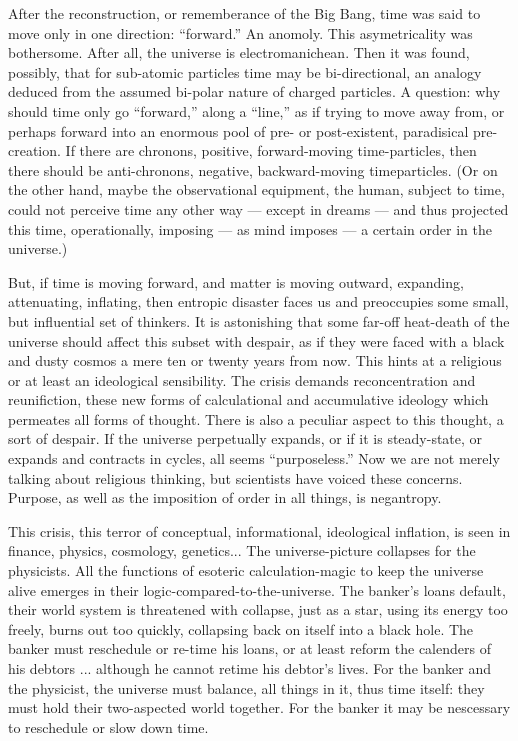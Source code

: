 \documentclass[11pt,twoside,draft]{memoir}
\begin{document}
After the reconstruction, or rememberance
of the Big Bang, time was said to move only
in one direction: \enquote{forward.} An anomoly.
This asymetricality was bothersome. After
all, the universe is electromanichean. Then
it was found, possibly, that for sub-atomic
particles time may be bi-directional, an analogy deduced from the assumed bi-polar nature of charged particles. A question: why
should time only go \enquote{forward,} along a
\enquote{line,} as if trying to move away from, or
perhaps forward into an enormous pool of
pre- or post-existent, paradisical pre-creation.
If there are chronons, positive, forward-moving time-particles, then there should be anti-chronons, negative, backward-moving timeparticles. (Or on the other hand, maybe the
observational equipment, the human, subject to time, could not perceive time any
other way --- except in dreams --- and thus projected this time, operationally, imposing ---
as mind imposes --- a certain order in the universe.)

But, if time is moving forward, and matter
is moving outward, expanding, attenuating,
inflating, then entropic disaster faces us and
preoccupies some small, but influential set
of thinkers. It is astonishing that some far-off
heat-death of the universe should affect this
subset with despair, as if they were faced
with a black and dusty cosmos a mere ten or
twenty years from now. This hints at a religious or at least an ideological sensibility.
The crisis demands reconcentration and reunifiction, these new forms of calculational
and accumulative ideology which permeates
all forms of thought. There is also a peculiar
aspect to this thought, a sort of despair. If the
universe perpetually expands, or if it is
steady-state, or expands and contracts in
cycles, all seems \enquote{purposeless.} Now we are
not merely talking about religious thinking,
but scientists have voiced these concerns.
Purpose, as well as the imposition of order in
all things, is negantropy.

This crisis, this terror of conceptual, informational,
ideological inflation, is seen in finance, physics, cosmology, genetics...
The universe-picture collapses for the physicists. All the functions of esoteric calculation-magic to keep the universe alive emerges
in their logic-compared-to-the-universe. The
banker's loans default, their world system is
threatened with collapse, just as a star, using
its energy too freely, burns out too quickly,
collapsing back on itself into a black hole.
The banker must reschedule or re-time his
loans, or at least reform the calenders of his
debtors ... although he cannot retime his
debtor's lives. For the banker and the physicist, the universe must balance, all things in
it, thus time itself: they must hold their
two-aspected world together. For the banker
it may be nescessary to reschedule or slow
down time.
\end{document}
